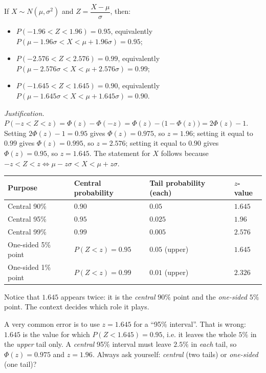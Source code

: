 \documentclass[11pt]{article}
\begin{document}
\begin{propriete}
If $X\sim N(\mu,\sigma^{2})$ and $Z=\dfrac{X-\mu}{\sigma}$, then:
\begin{itemize}
\item $P(-1.96<Z<1.96)=0.95$, equivalently $P(\mu-1.96\sigma<X<\mu+1.96\sigma)=0.95$;
\item $P(-2.576<Z<2.576)=0.99$, equivalently $P(\mu-2.576\sigma<X<\mu+2.576\sigma)=0.99$;
\item $P(-1.645<Z<1.645)=0.90$, equivalently $P(\mu-1.645\sigma<X<\mu+1.645\sigma)=0.90$.
\end{itemize}
\emph{Justification.} $P(-z<Z<z)=\Phi(z)-\Phi(-z)=\Phi(z)-\bigl(1-\Phi(z)\bigr)=2\Phi(z)-1$. Setting $2\Phi(z)-1=0.95$ gives $\Phi(z)=0.975$, so $z=1.96$; setting it equal to $0.99$ gives $\Phi(z)=0.995$, so $z=2.576$; setting it equal to $0.90$ gives $\Phi(z)=0.95$, so $z=1.645$. The statement for $X$ follows because $-z<Z<z \iff \mu-z\sigma<X<\mu+z\sigma$.
\end{propriete}

\begin{aretenir}
\begin{center}
\begin{tabularx}{\linewidth}{|l|X|X|X|}
\hline
\rowcolor{popblueL} Purpose & Central probability & Tail probability (each) & $z$-value \\
\hline
Central 90\% & $0.90$ & $0.05$ & $1.645$ \\
\hline
Central 95\% & $0.95$ & $0.025$ & $1.96$ \\
\hline
Central 99\% & $0.99$ & $0.005$ & $2.576$ \\
\hline
One-sided 5\% point & $P(Z<z)=0.95$ & $0.05$ (upper) & $1.645$ \\
\hline
One-sided 1\% point & $P(Z<z)=0.99$ & $0.01$ (upper) & $2.326$ \\
\hline
\end{tabularx}
\end{center}
Notice that $1.645$ appears twice: it is the \emph{central} $90\%$ point and the \emph{one-sided} $5\%$ point. The context decides which role it plays.
\end{aretenir}

\begin{attention}
A very common error is to use $z=1.645$ for a ``95\% interval''. That is wrong: $1.645$ is the value for which $P(Z<1.645)=0.95$, i.e. it leaves the whole $5\%$ in the \emph{upper} tail only. A \emph{central} 95\% interval must leave $2.5\%$ in \emph{each} tail, so $\Phi(z)=0.975$ and $z=1.96$. Always ask yourself: \emph{central} (two tails) or \emph{one-sided} (one tail)?
\end{attention}
\end{document}
